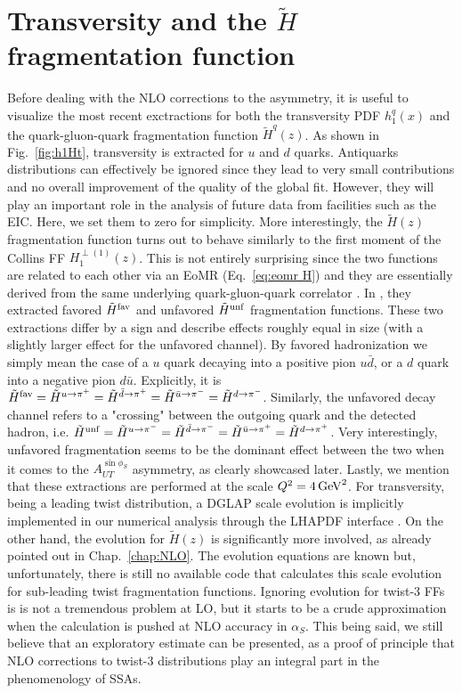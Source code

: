 \section{Transversity and the $\tilde{H}$ fragmentation function}
Before dealing with the NLO corrections to the asymmetry, it is useful to visualize the most recent exctractions for both the transversity PDF $h_1^q(x)$ and the quark-gluon-quark fragmentation function $\tilde{H}^q(z)$.  As shown in Fig.~\ref{fig:h1Ht}, transversity is extracted for $u$ and $d$ quarks. Antiquarks distributions can effectively be ignored since they lead to very small contributions and no overall improvement of the quality of the global fit. However, they will play an important role in the analysis of future data from facilities such as the EIC. Here, we set them to zero for simplicity. More interestingly, the $\tilde{H}(z)$ fragmentation function turns out to behave similarly to the first moment of the Collins FF $H_1^{\perp(1)}(z)$. This is not entirely surprising since the two functions are related to each other via an EoMR (Eq.~\eqref{eq:eomr H}) and they are essentially derived from the same underlying quark-gluon-quark correlator \cite{kanazawa_operator_2016}. In \cite{Gamberg2022Htilde}, they extracted favored $\tilde{H}^{\rm fav}$ and unfavored $\tilde{H}^{\rm unf}$ fragmentation functions. These two extractions differ by a sign and describe effects roughly equal in size (with a slightly larger effect for the unfavored channel). By favored hadronization we simply mean the case of a $u$ quark decaying into a positive pion $u\bar{d}$, or a $d$ quark into a negative pion $d\bar{u}$. Explicitly, it is $\tilde{H}^{\rm fav}=\tilde{H}^{u\to \pi^+}=\tilde{H}^{\bar{d}\to \pi^+}=\tilde{H}^{\bar{u}\to \pi^-}=\tilde{H}^{d\to \pi^-}$. Similarly, the unfavored decay channel refers to a "crossing" between the outgoing quark and the detected hadron, i.e. $\tilde{H}^{\rm unf}=\tilde{H}^{u\to \pi^-}=\tilde{H}^{\bar{d}\to \pi^-}=\tilde{H}^{\bar{u}\to \pi^+}=\tilde{H}^{d\to \pi^+}$. Very interestingly, unfavored fragmentation seems to be the dominant effect between the two when it comes to the $A_{UT}^{\sin\phi_S}$ asymmetry, as clearly showcased later. Lastly, we mention that these extractions are performed at the scale $Q^2=4\,\rm{GeV}^2$. For transversity, being a leading twist distribution, a DGLAP scale evolution is implicitly implemented in our numerical analysis through the LHAPDF interface \cite{}. On the other hand, the evolution for $\tilde{H}(z)$ is significantly more involved, as already pointed out in Chap.~\ref{chap:NLO}. The evolution equations are known \cite{Ma_2017} but, unfortunately, there is still no available code that calculates this scale evolution for sub-leading twist fragmentation functions. Ignoring evolution for twist-3 FFs is is not a tremendous problem at LO, but it starts to be a crude approximation when the calculation is pushed at NLO accuracy in $\alpha_S$. This being said, we still believe that an exploratory estimate can be presented, as a proof of principle that NLO corrections to twist-3 distributions play an integral part in the phenomenology of SSAs.


